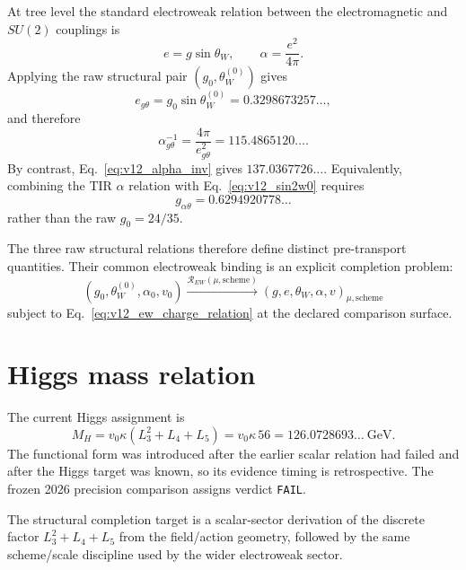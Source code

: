 At tree level the standard electroweak relation between the electromagnetic and $SU(2)$ couplings is
\begin{equation}
e=g\sin\theta_W,
\qquad
\alpha=\frac{e^2}{4\pi}.
\label{eq:v12_ew_charge_relation}
\end{equation}
Applying the raw structural pair $(g_0,\theta_W^{(0)})$ gives
\begin{equation}
e_{g\theta}=g_0\sin\theta_W^{(0)}
=0.3298673257\ldots,
\end{equation}
and therefore
\begin{equation}
\boxed{
\alpha_{g\theta}^{-1}
=\frac{4\pi}{e_{g\theta}^2}
=115.4865120\ldots .
}
\label{eq:v12_alpha_from_gtheta}
\end{equation}
By contrast, Eq.~\eqref{eq:v12_alpha_inv} gives $137.0367726\ldots$. Equivalently, combining the TIR $\alpha$ relation with Eq.~\eqref{eq:v12_sin2w0} requires
\begin{equation}
\boxed{g_{\alpha\theta}=0.6294920778\ldots}
\end{equation}
rather than the raw $g_0=24/35$.

The three raw structural relations therefore define distinct pre-transport quantities. Their common electroweak binding is an explicit completion problem:
\begin{equation}
\boxed{
(g_0,\theta_W^{(0)},\alpha_0,v_0)
\xrightarrow{\mathcal R_{EW}(\mu,\mathrm{scheme})}
(g,e,\theta_W,\alpha,v)_{\mu,\mathrm{scheme}}
}
\label{eq:v12_ew_full_closure}
\end{equation}
subject to Eq.~\eqref{eq:v12_ew_charge_relation} at the declared comparison surface.

\section{Higgs mass relation}

The current Higgs assignment is
\begin{equation}
\boxed{
M_H=v_0\kappa(L_3^2+L_4+L_5)
=v_0\kappa\,56
=126.0728693\ldots\ \mathrm{GeV}.
}
\label{eq:v12_higgs_mass}
\end{equation}
The functional form was introduced after the earlier scalar relation had failed and after the Higgs target was known, so its evidence timing is retrospective. The frozen 2026 precision comparison assigns verdict \texttt{FAIL}.

The structural completion target is a scalar-sector derivation of the discrete factor $L_3^2+L_4+L_5$ from the field/action geometry, followed by the same scheme/scale discipline used by the wider electroweak sector.

